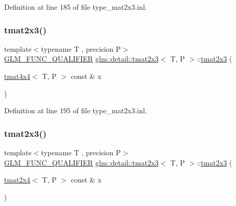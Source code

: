 Definition at line 185 of file type\+\_\+mat2x3.\+inl.

\mbox{\label{structglm_1_1detail_1_1tmat2x3_a4dc8800ba18dd4b395c68faf51009776}} 
\subsubsection{\texorpdfstring{tmat2x3()}{tmat2x3()}\hspace{0.1cm}{\footnotesize\ttfamily [13/22]}}
{\footnotesize\ttfamily template$<$typename T , precision P$>$ \\
\hyperlink{setup_8hpp_a33fdea6f91c5f834105f7415e2a64407}{G\+L\+M\+\_\+\+F\+U\+N\+C\+\_\+\+Q\+U\+A\+L\+I\+F\+I\+ER} \hyperlink{structglm_1_1detail_1_1tmat2x3}{glm\+::detail\+::tmat2x3}$<$ T, P $>$\+::\hyperlink{structglm_1_1detail_1_1tmat2x3}{tmat2x3} (\begin{DoxyParamCaption}\item[{\hyperlink{structglm_1_1detail_1_1tmat4x4}{tmat4x4}$<$ T, P $>$ const \&}]{x }\end{DoxyParamCaption})\hspace{0.3cm}{\ttfamily [explicit]}}



Definition at line 195 of file type\+\_\+mat2x3.\+inl.

\mbox{\label{structglm_1_1detail_1_1tmat2x3_a54b8586adbda881d55b2c98a39ed58c5}} 
\subsubsection{\texorpdfstring{tmat2x3()}{tmat2x3()}\hspace{0.1cm}{\footnotesize\ttfamily [14/22]}}
{\footnotesize\ttfamily template$<$typename T , precision P$>$ \\
\hyperlink{setup_8hpp_a33fdea6f91c5f834105f7415e2a64407}{G\+L\+M\+\_\+\+F\+U\+N\+C\+\_\+\+Q\+U\+A\+L\+I\+F\+I\+ER} \hyperlink{structglm_1_1detail_1_1tmat2x3}{glm\+::detail\+::tmat2x3}$<$ T, P $>$\+::\hyperlink{structglm_1_1detail_1_1tmat2x3}{tmat2x3} (\begin{DoxyParamCaption}\item[{\hyperlink{structglm_1_1detail_1_1tmat2x4}{tmat2x4}$<$ T, P $>$ const \&}]{x }\end{DoxyParamCaption})\hspace{0.3cm}{\ttfamily [explicit]}}



